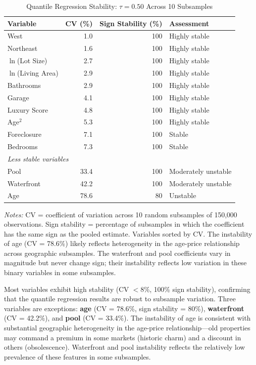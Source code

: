 \begin{table}[H]
\centering
\caption{Quantile Regression Stability: $\tau = 0.50$ Across 10 Subsamples}
\label{tab:qr_stability}
\begin{threeparttable}
\small
\begin{tabular}{lrrl}
\toprule
Variable & CV (\%) & Sign Stability (\%) & Assessment \\
\midrule
West & 1.0 & 100 & Highly stable \\
Northeast & 1.6 & 100 & Highly stable \\
$\ln$(Lot Size) & 2.7 & 100 & Highly stable \\
$\ln$(Living Area) & 2.9 & 100 & Highly stable \\
Bathrooms & 2.9 & 100 & Highly stable \\
Garage & 4.1 & 100 & Highly stable \\
Luxury Score & 4.8 & 100 & Highly stable \\
Age$^2$ & 5.3 & 100 & Highly stable \\
Foreclosure & 7.1 & 100 & Stable \\
Bedrooms & 7.3 & 100 & Stable \\
\midrule
\multicolumn{4}{l}{\textit{Less stable variables}} \\
Pool & 33.4 & 100 & Moderately unstable \\
Waterfront & 42.2 & 100 & Moderately unstable \\
Age & 78.6 & 80 & Unstable \\
\bottomrule
\end{tabular}
\begin{tablenotes}
\small
\item \textit{Notes:} CV = coefficient of variation across 10 random subsamples of 150,000 observations. Sign stability = percentage of subsamples in which the coefficient has the same sign as the pooled estimate. Variables sorted by CV. The instability of age (CV = 78.6\%) likely reflects heterogeneity in the age-price relationship across geographic subsamples. The waterfront and pool coefficients vary in magnitude but never change sign; their instability reflects low variation in these binary variables in some subsamples.
\end{tablenotes}
\end{threeparttable}
\end{table}

Most variables exhibit high stability (CV $< 8\%$, 100\% sign stability), confirming that the quantile regression results are robust to subsample variation. Three variables are exceptions: \textbf{age} (CV = 78.6\%, sign stability = 80\%), \textbf{waterfront} (CV = 42.2\%), and \textbf{pool} (CV = 33.4\%). The instability of age is consistent with substantial geographic heterogeneity in the age-price relationship---old properties may command a premium in some markets (historic charm) and a discount in others (obsolescence). Waterfront and pool instability reflects the relatively low prevalence of these features in some subsamples.


